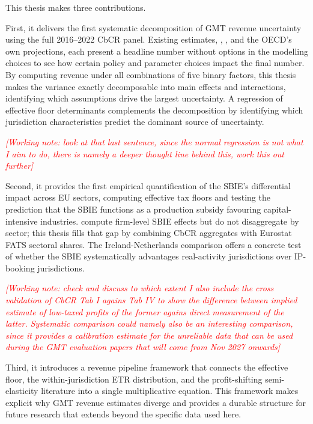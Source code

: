 \documentclass[11pt,a4paper]{article}
\newcommand{\workingnote}[1]{\ifworkingdoc\par\noindent\textcolor{red}{\textit{[Working note: #1]}}\par\fi}
\begin{document}
This thesis makes three contributions.

First, it delivers the first systematic decomposition of GMT revenue uncertainty using the full 2016--2022 CbCR panel. Existing estimates, \citet{barake2022}, \citet{hugger2026}, and the OECD's own projections, each present a headline number without options in the modelling choices to see how certain policy and parameter choices impact the final number. By computing revenue under all combinations of five binary factors, this thesis makes the variance exactly decomposable into main effects and interactions, identifying which assumptions drive the largest uncertainty. A regression of effective floor determinants complements the decomposition by identifying which jurisdiction characteristics predict the dominant source of uncertainty.
\workingnote{look at that last sentence, since the normal regression is not what I aim to do, there is namely a deeper thought line behind this, work this out further}

Second, it provides the first empirical quantification of the SBIE's differential impact across EU sectors, computing effective tax floors and testing the \citet{schjelderup2024} prediction that the SBIE functions as a production subsidy favouring capital-intensive industries. \citet{devereux2023} compute firm-level SBIE effects but do not disaggregate by sector; this thesis fills that gap by combining CbCR aggregates with Eurostat FATS sectoral shares. The Ireland-Netherlands comparison offers a concrete test of whether the SBIE systematically advantages real-activity jurisdictions over IP-booking jurisdictions.

\workingnote{check and discuss to which extent I also include the cross validation of CbCR Tab I agains Tab IV to show the difference between implied estimate of low-taxed profits of the former agains direct measurement of the latter. Systematic comparison could namely also be an interesting comparison, since it provides a calibration estimate for the unreliable data that can be used during the GMT evaluation papers that will come from Nov 2027 onwards}

Third, it introduces a revenue pipeline framework that connects the \citet{schjelderup2024} effective floor, the \citet{hugger2026} within-jurisdiction ETR distribution, and the profit-shifting semi-elasticity literature into a single multiplicative equation. This framework makes explicit why GMT revenue estimates diverge and provides a durable structure for future research that extends beyond the specific data used here.
\end{document}
